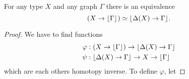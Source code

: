 \begin{lem}
For any type $X$ and any graph $\Gamma$ there is an equivalence
\begin{equation*}
(X\to\lfloor \Gamma \rfloor^{}) \simeq \lfloor \Delta(X)\to\Gamma \rfloor^{}.
\end{equation*}
\end{lem}

\begin{proof}
We have to find functions
\begin{align*}
\varphi & : (X\to\lfloor \Gamma \rfloor^{})\to\lfloor \Delta(X)\to\Gamma \rfloor^{}\\
\psi & : \lfloor \Delta(X)\to\Gamma \rfloor^{}\to X\to\lfloor \Gamma \rfloor^{}
\end{align*}
which are each others homotopy inverse. To define $\varphi$, let
\end{proof}
\endgroup

